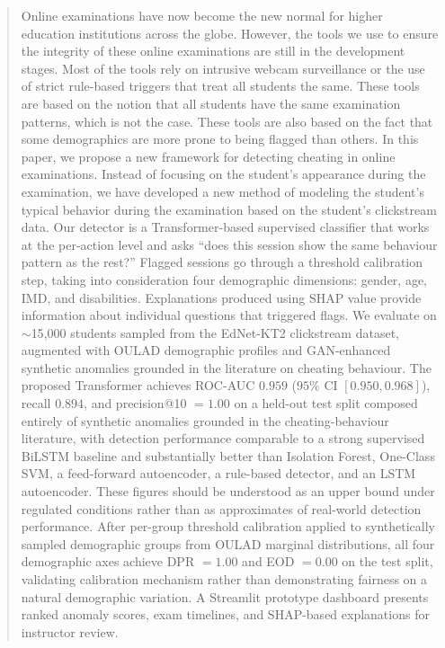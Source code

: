 \documentclass[sigconf]{acmart}
\begin{document}
\begin{abstract}
Online examinations have now become the new normal for higher
education institutions across the globe. However, the tools we use to ensure the integrity of these online examinations are still in the development stages. Most of the tools rely on intrusive webcam surveillance or the use of strict rule-based triggers that treat all students the same. These tools are based on the notion that all students have the same examination patterns, which is not the case. These tools are also based on the fact that some demographics are more prone to being flagged than others. In this paper, we propose a new framework for detecting cheating in online examinations. Instead of focusing on the student’s appearance during the examination, we have developed a new method of modeling the student’s typical
behavior during the examination based on the student’s clickstream data.  Our detector is a Transformer-based supervised classifier that works at the per-action level and asks ``does this session show the same behaviour pattern as the rest?'' Flagged sessions go through a threshold calibration step, taking into consideration four demographic dimensions: gender, age, IMD, and disabilities. Explanations produced using SHAP value provide information about individual questions that triggered flags. We evaluate on $\sim$15{,}000 students sampled from the EdNet-KT2 clickstream dataset, augmented with OULAD demographic profiles and GAN-enhanced synthetic anomalies grounded in the literature on cheating behaviour. The proposed Transformer achieves ROC-AUC $0.959$ ($95\%$ CI $[0.950, 0.968]$), recall $0.894$, and precision@10 $= 1.00$ on a held-out test split composed entirely of synthetic anomalies grounded in the cheating-behaviour literature, with detection performance comparable to a strong supervised BiLSTM baseline and substantially better than Isolation Forest, One-Class SVM, a feed-forward autoencoder, a rule-based detector, and an LSTM autoencoder. These figures should be understood as an upper bound under regulated conditions rather than as approximates of real-world detection performance. After per-group threshold calibration applied to synthetically sampled demographic groups from OULAD marginal distributions, all four demographic axes achieve DPR $= 1.00$ and EOD $= 0.00$ on the test split, validating calibration mechanism rather than demonstrating fairness on a natural demographic variation. A Streamlit prototype dashboard presents ranked anomaly scores, exam timelines, and SHAP-based explanations for instructor review.
\end{abstract}
\end{document}
